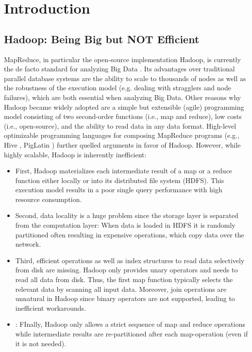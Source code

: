 \documentclass{sig-alternate}
\begin{document}
\section{Introduction}
\label{sec:intro}

\subsection{Hadoop: Being Big but NOT Efficient}
\label{sec:intro:hadoop}

MapReduce, in particular the open-source implementation Hadoop, is currently the de facto standard for analyzing Big Data \cite{MapReduce:CACM:08, Hadoop:OReilly:09}. Its advantages over traditional parallel database systems are the ability to scale to thousands of nodes as well as the robustness of the execution model (e.g. dealing with stragglers and node failures), which are both essential when analyzing Big Data. Other reasons why Hadoop became widely adopted are a simple but extensible (agile) programming model consisting of two second-order functions (i.e., map and reduce), low costs (i.e., open-source), and the ability to read data in any data format. High-level optimizable programming languages for composing MapReduce programs (e.g., Hive \cite{Hive:ICDE:2010}, PigLatin \cite{Pig:PVLDB:2009}) further quelled arguments in favor of Hadoop. However, while highly scalable, Hadoop is inherently inefficient:

\begin{itemize}
\setlength{\itemsep}{-1pt}
\item First, Hadoop materializes each intermediate result of a map or a reduce function either locally or into its distributed file system (HDFS). This execution model results in a poor single query performance with high resource consumption. 
\item Second, data locality is a huge problem since the storage layer is separated from the computation layer: When data is loaded in HDFS it is randomly partitioned often resulting in expensive operations, which copy data over the network.
\item Third, efficient operations as well as index structures to read data selectively from disk are missing. Hadoop only provides unary operators and needs to read all data from disk. Thus, the first map function typically selects the relevant data by scanning all input data. Moreover, join operations are unnatural in Hadoop since binary operators are not supported, leading to inefficient workarounds. 
\item: FInally, Hadoop only allows a strict sequence of map and reduce operations while intermediate results are re-partitioned after each map-operation (even if it is not needed).
\end{itemize}
\end{document}
